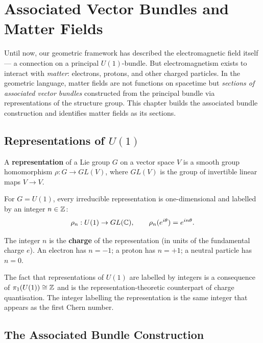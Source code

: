 \chapter{Associated Vector Bundles and Matter Fields}

Until now, our geometric framework has described the electromagnetic field itself --- a connection on a principal $U(1)$-bundle. But electromagnetism exists to interact with \emph{matter}: electrons, protons, and other charged particles. In the geometric language, matter fields are not functions on spacetime but \emph{sections of associated vector bundles} constructed from the principal bundle via representations of the structure group. This chapter builds the associated bundle construction and identifies matter fields as its sections.

\section{Representations of $U(1)$}

\begin{definition}[Representation]
A \textbf{representation} of a Lie group $G$ on a vector space $V$ is a smooth group homomorphism $\rho: G \to GL(V)$, where $GL(V)$ is the group of invertible linear maps $V \to V$.
\end{definition}

For $G = U(1)$, every irreducible representation is one-dimensional and labelled by an integer $n \in \mathbb{Z}$:
\begin{equation}
\rho_n: U(1) \to GL(\mathbb{C}), \qquad \rho_n(e^{i\theta}) = e^{in\theta}.
\end{equation}

The integer $n$ is the \textbf{charge} of the representation (in units of the fundamental charge $e$). An electron has $n = -1$; a proton has $n = +1$; a neutral particle has $n = 0$.

\begin{remark}
The fact that representations of $U(1)$ are labelled by integers is a consequence of $\pi_1(U(1)) \cong \mathbb{Z}$ and is the representation-theoretic counterpart of charge quantisation. The integer labelling the representation is the same integer that appears as the first Chern number.
\end{remark}

\section{The Associated Bundle Construction}


